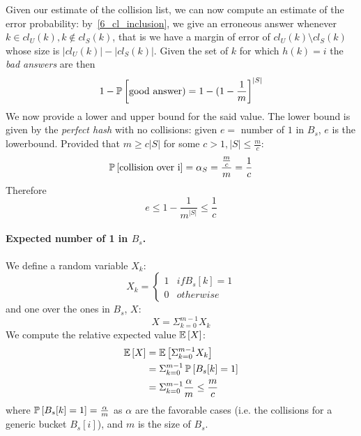 Given our estimate of the collision list, we can now compute an estimate of the
error probability: by~\ref{6_cl_inclusion}, we give an erroneous answer whenever
$k \in cl_{U}(k), k \notin cl_{S}(k)$, that is we have a margin of error of
$cl_{U}(k) \setminus cl_{S}(k)$ whose size is $|cl_{U}(k)| - |cl_{S}(k)|$.
Given the set of $k$ for which $h(k) = i$ the \emph{bad answers} are then
    \begin{equation}
    1 - \operatorname*{\mathbb{P}}\left[{\textrm{good answer}) = 1 - {(1 - \frac{1}{m}}}\right]^{|S|}
    \end{equation}
We now provide a lower and upper bound for the said value.
The lower bound is given by the \emph{perfect hash} with no collisions: given
$e = $ number of $1$ in $B_s$, $e$ is the lowerbound.
Provided that  $m \geq c |S|$ for some $c > 1, |S| \leq \frac{m}{c}$:
    \begin{equation}
    \operatorname*{\mathbb{P}}\left[{\textrm{collision over i}}\right] = \alpha_{S} = \frac{\frac{m}{c}}{m} = \frac{1}{c}
    \end{equation}
Therefore
    \begin{equation}
    e \leq 1 - \frac{1}{m^{|S|}} \leq \frac{1}{c}
    \end{equation}

\paragraph{Expected number of 1 in $B_{s}$.}
We define a random variable $X_{k}$:
    \begin{equation*}
    X_{k} = \begin{cases}
            1   & if B_{s}[k] = 1  \\
            0   & otherwise
            \end{cases}
    \end{equation*}
and one over the ones in $B_{s}$, $X$:
    \begin{equation}
        X = \Sigma_{k = 0}^{m - 1}X_k
    \end{equation}
We compute the relative expected value $\mathbb{E}\left[{X}\right]$:
    \begin{align*}
       \mathbb{E}\left[{X}\right] & = \mathbb{E}\left[{\Sigma_{k = 0}^{m - 1}X_k}\right] \\
       & = \Sigma_{k = 0}^{m - 1}\operatorname*{\mathbb{P}}\left[{B_{s}[k] = 1}\right] \\
       & = \Sigma_{k = 0}^{m - 1}\frac{\alpha}{m} \leq \frac{m}{c}
   \end{align*}
where $\operatorname*{\mathbb{P}}\left[{B_{s}[k] = 1}\right] = \frac{\alpha}{m}$ as $\alpha$ are the favorable cases
(i.e. the collisions for a generic bucket $B_s[i]$), and $m$ is the size of $B_s$.
